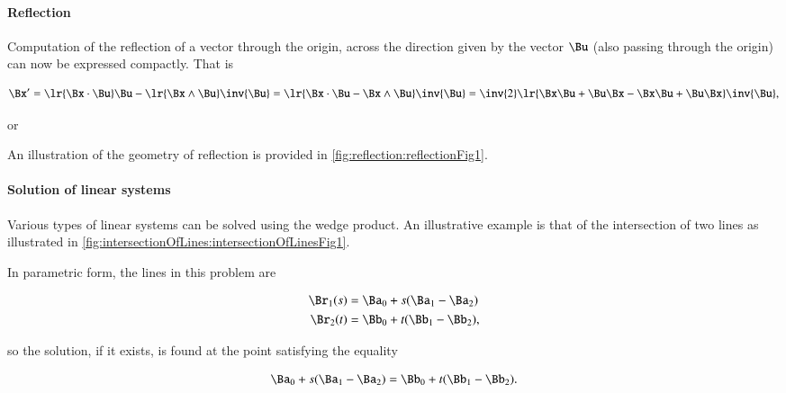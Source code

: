 \paragraph{Reflection}

Computation of the reflection of a vector through the origin, across the direction given by the vector \( \Bu \) (also passing through the origin) can now be expressed compactly.
That is

\begin{dmath}\label{eqn:SimpleProducts2:900}
\Bx'
= \lr{ \Bx \cdot \Bu }\Bu - \lr{ \Bx \wedge \Bu } \inv{\Bu }
= \lr{ \Bx \cdot \Bu - \Bx \wedge \Bu } \inv{\Bu }
= \inv{2} \lr{ \Bx \Bu + \Bu \Bx - \Bx \Bu + \Bu \Bx } \inv{\Bu },
\end{dmath}

or

An illustration of the geometry of reflection is provided in \cref{fig:reflection:reflectionFig1}.


\paragraph{Solution of linear systems}

Various types of linear systems can be solved using the wedge product.
An illustrative example is that of the intersection of two lines as illustrated in \cref{fig:intersectionOfLines:intersectionOfLinesFig1}.


In parametric form, the lines in this problem are

\begin{dmath}\label{eqn:SimpleProducts2:1000}
\begin{aligned}
\Br_1(s) &= \Ba_0 + s( \Ba_1 - \Ba_2 ) \\
\Br_2(t) &= \Bb_0 + t( \Bb_1 - \Bb_2 ),
\end{aligned}
\end{dmath}

so the solution, if it exists, is found at the point satisfying the equality

\begin{dmath}\label{eqn:SimpleProducts2:1020}
\Ba_0 + s( \Ba_1 - \Ba_2 ) = \Bb_0 + t( \Bb_1 - \Bb_2 ).
\end{dmath}

